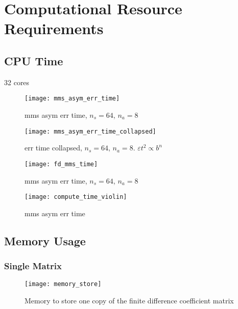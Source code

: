 \section{Computational Resource Requirements}
\subsection{CPU Time}
32 cores

\begin{figure}[H]
  \centering
  \texttt{[image: mms\_asym\_err\_time]}
  \caption{mms asym err time, $n_s=64$, $n_a=8$}
  \label{fig:mms_asym_err_time}
\end{figure}

\begin{figure}[H]
  \centering
  \texttt{[image: mms\_asym\_err\_time\_collapsed]}
  \caption{err time collapsed, $n_s=64$, $n_a=8$. $\varepsilon t^2 \propto b^n$}
  \label{fig:mms_asym_err_time_collapsed}
\end{figure}

\begin{figure}[H]
  \centering
  \texttt{[image: fd\_mms\_time]}
  \caption{mms asym err time, $n_s=64$, $n_a=8$}
  \label{fig:fd_mms_time}
\end{figure}

\begin{figure}[H]
  \centering
  \texttt{[image: compute\_time\_violin]}
  \caption{mms asym err time}
  \label{fig:compute_time_violin}
\end{figure}

\subsection{Memory Usage}
\subsubsection{Single Matrix}
\begin{figure}[H]
  \centering
  \texttt{[image: memory\_store]}
  \caption{Memory to store one copy of the finite difference coefficient matrix}
  \label{fig:memory_store}
\end{figure}

